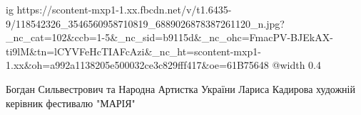  
 
 
 
 

\ifcmt
  ig https://scontent-mxp1-1.xx.fbcdn.net/v/t1.6435-9/118542326_3546560958710819_6889026878387261120_n.jpg?_nc_cat=102&ccb=1-5&_nc_sid=b9115d&_nc_ohc=FmacPV-BJEkAX-ti9lM&tn=lCYVFeHcTIAFcAzi&_nc_ht=scontent-mxp1-1.xx&oh=a992a1138205e500032ce3c829fff417&oe=61B75648
  @width 0.4
\fi


Богдан Сильвестрович та Народна Артистка України Лариса Кадирова художній
керівник фестивалю "МАРІЯ"
